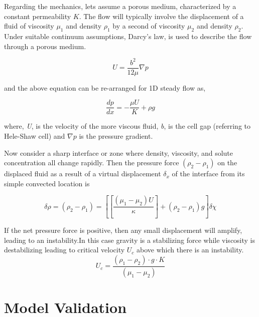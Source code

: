 \documentclass[preprint,authoryear,12pt]{elsarticle}
\begin{document}
Regarding the mechanics, lets assume a porous medium, characterized by a constant permeability $K$. The flow will typically involve the displacement of a fluid of viscosity $\mu_1$  and density $\rho_1$ by a second of viscosity $\mu_2$ and density $\rho_2$. Under suitable continuum assumptions, Darcy's law, is used to describe the flow through a porous medium.

\begin{equation}
 U = \frac{b^2}{12 \mu} \nabla p
\end{equation}

and the above equation can be re-arranged for 1D steady flow as,

\begin{equation}
 \frac{dp}{dx}= - \frac{\mu U}{K} + \rho g 
\end{equation}


where, \textit{U}, is the velocity of the more viscous fluid, \textit{b}, is the cell gap (referring to Hele-Shaw cell) and \textit{$\nabla p$} is the pressure gradient.



Now consider a sharp interface or zone where density, viscosity, and solute concentration all change rapidly. Then the pressure force $(\rho_2-\rho_1)$ on the displaced fluid as a result of a virtual displacement $\delta_x$ of the interface from its simple convected location is 

\begin{equation}
\delta\rho=(\rho_2-\rho_1)=[[\frac{(\mu_1-\mu_2)U}{\kappa}]+(\rho_2-\rho_1)g] \delta\chi
\end{equation}

If the net pressure force is positive, then any small displacement will amplify, leading to an instability.In this case gravity is a stabilizing force while viscosity is destabilizing leading to critical velocity $U_c$ above which there is an instability.\\

\begin{equation}
U_c = \frac{(\rho_1-\rho_2) \cdot g \cdot K}{(\mu_1-\mu_2)}
\end{equation}

 
\section{Model Validation}\label{section:ModelValidation}
 
\end{document}
